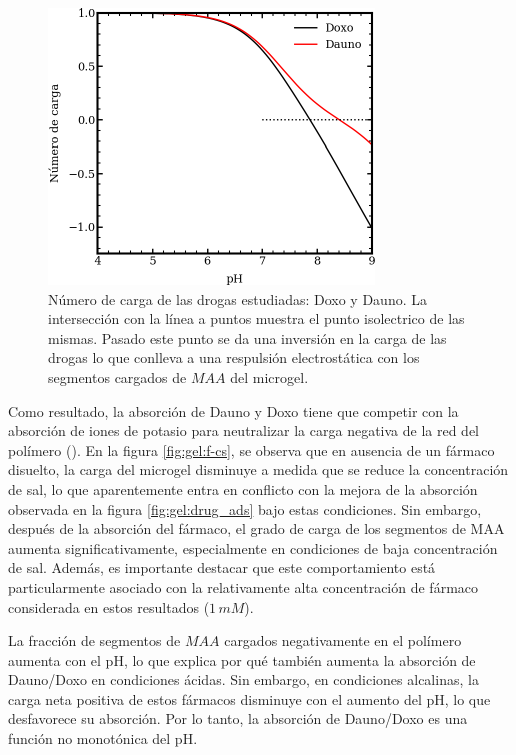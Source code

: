 \begin{figure}[!tb]
	\centering
	\includegraphics[width=0.9\linewidth]{Figures/graph-gel/drugs-Q.pdf}
	\caption{N\'umero de carga de las drogas estudiadas: Doxo y Dauno. La intersecci\'on con la l\'inea a puntos muestra el punto isolectrico de las mismas. Pasado este punto se da una inversi\'on en la carga de las drogas lo que conlleva a una respulsi\'on electrost\'atica con los segmentos cargados de $MAA$ del microgel. }
	\label{fig:gel:carga-drug_ads}
\end{figure}

Como resultado, la absorci\'on de Dauno y Doxo tiene que competir con la absorci\'on de iones de potasio para neutralizar la carga negativa de la red del pol\'imero (\citet{PerezChavez2020}). En la figura \ref{fig:gel:f-cs}, se observa que en ausencia de un f\'armaco disuelto, la carga del microgel disminuye a medida que se reduce la concentraci\'on de sal, lo que aparentemente entra en conflicto con la mejora de la absorci\'on observada en la figura \ref{fig:gel:drug_ads} bajo estas condiciones. Sin embargo, despu\'es de la absorci\'on del f\'armaco, el grado de carga de los segmentos de MAA aumenta significativamente, especialmente en condiciones de baja concentraci\'on de sal. Adem\'as, es importante destacar que este comportamiento est\'a particularmente asociado con la relativamente alta concentraci\'on de f\'armaco considerada en estos resultados ($1\, mM$).

La fracci\'on de segmentos de $MAA$ cargados negativamente en el pol\'imero aumenta con el pH, lo que explica por qu\'e tambi\'en aumenta la absorci\'on de Dauno/Doxo en condiciones \'acidas. Sin embargo, en condiciones alcalinas, la carga neta positiva de estos f\'armacos disminuye con el aumento del pH, lo que desfavorece su absorci\'on. Por lo tanto, la absorci\'on de Dauno/Doxo es una funci\'on no monot\'onica del pH.

